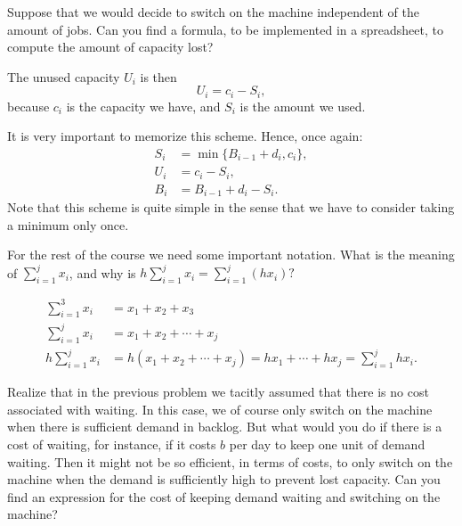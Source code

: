 \begin{question}

  Suppose that we would decide to switch on the machine independent
  of the amount of jobs. Can you find a formula, to be implemented in
  a spreadsheet, to compute the amount of capacity lost?
\end{question}

  \begin{solution}
The unused capacity $U_i$ is then
\begin{equation*}
  U_i = c_i - S_i,
\end{equation*}
because $c_i$ is the capacity we have, and $S_i$ is the amount we
used.

It is very important to memorize this scheme. Hence, once again:
\begin{align*}
      S_i &= \min\{B_{i-1}+d_i, c_i\}, \\
  U_i &= c_i - S_i, \\
  B_i &= B_{i-1}+d_i - S_i.
\end{align*}
Note that this scheme is quite simple in the sense that we have to
consider taking a minimum only once. 

  \end{solution}


\begin{question}
  For the rest of the course we need some important notation. What is the meaning of $\sum_{i=1}^j x_i$, and why is $h \sum_{i=1}^j x_i = \sum_{i=1}^j (hx_i)?$
\end{question}

  \begin{solution}
    \begin{align*}
      \sum_{i=1}^3 x_i &= x_1 + x_2 + x_3 \\
      \sum_{i=1}^j x_i &= x_1 + x_2 + \cdots +x_j \\
     h \sum_{i=1}^j x_i &= h(x_1 + x_2 + \cdots +x_j) = hx_1 + \cdots+hx_j = \sum_{i=1}^j h x_i.
    \end{align*}
  \end{solution}

\begin{question}
  Realize that in the previous problem we tacitly assumed that there
  is no cost associated with waiting.  In this case, we of course only
  switch on the machine when there is sufficient demand in
  backlog. But what would you do if there is a cost of waiting, for
  instance, if it costs $b$ per day to keep one unit of demand
  waiting. Then it might not be so efficient, in terms of costs, to
  only switch on the machine when the demand is sufficiently high to
  prevent lost capacity. Can you find an expression for the cost of
  keeping demand waiting and switching on the machine?
\end{question}

